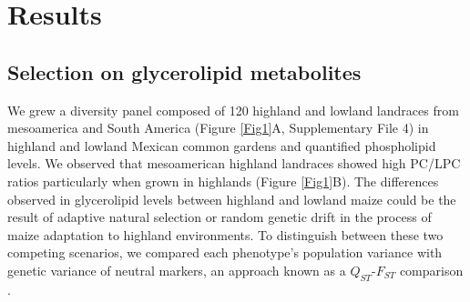 \documentclass[9pt,twocolumn,twoside,lineno]{BioRxiv}
\begin{document}
\section{Results}
\label{sec:results}
\subsection{Selection on glycerolipid metabolites}  
We grew a diversity panel composed of 120 highland and lowland landraces from mesoamerica and South America (Figure \ref{Fig1}A, Supplementary File 4) in highland and lowland Mexican common gardens and quantified phospholipid levels.    
We observed that mesoamerican highland landraces showed  high PC/LPC ratios  particularly when grown in highlands (Figure \ref{Fig1}B). %
The differences observed in glycerolipid levels between highland and lowland maize could be the result of adaptive natural selection or random genetic drift in the process of maize adaptation to highland environments.
To distinguish between these two competing scenarios, we compared each phenotype's population variance with genetic variance of neutral markers, an approach known as a $Q_{ST}$-$F_{ST}$ comparison \cite{Leinonen2013-ic}.
\end{document}
